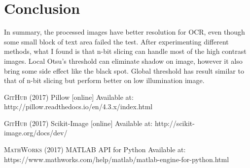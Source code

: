 \documentclass[titlepage]{article}
\begin{document}
\section{Conclusion}
\label{sec:orgf4739f0}
In summary, the processed images have better resolution for OCR, even though
some small block of text area failed the test. After experimenting different
methods, what I found is that n-bit slicing can handle most of the high
contrast images. Local Otsu's threshold can eliminate shadow on image, however
it also bring some side effect like the black spot. Global threshold has
result similar to that of n-bit slicing but perform better on low illumination
image.



\begin{thebibliography}{5}

\textsc{GitHub} (2017) Pillow [online] Available at: http://pillow.readthedocs.io/en/4.3.x/index.html

\textsc{GitHub} (2017) Scikit-Image [online] Available at: http://scikit-image.org/docs/dev/

\textsc{MathWorks} (2017) MATLAB API for Python
\newline
[online] Available at: https://www.mathworks.com/help/matlab/matlab-engine-for-python.html 

\end{thebibliography}
\end{document}
